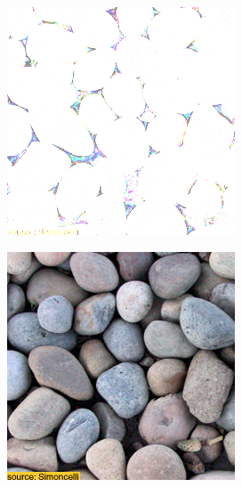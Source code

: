 \begin{figure}[]
\begin{subfigure}{\textwidth}
\begin{subfigure}{0.24\textwidth}
            \caption*{}
        \end{subfigure}
        \hfill
        \begin{subfigure}{0.24\textwidth}
            \centering
            \includegraphics[width=\textwidth]{images/04-experiment01/pebbles/1000/pebbles_im.jpg}
            \caption*{}
        \end{subfigure}
        \hfill
        \begin{subfigure}{0.24\textwidth}
            \centering
            \includegraphics[width=\textwidth]{images/04-experiment01/pebbles/1000/pebbles_proj.jpg}
            \caption*{}
        \end{subfigure}


\end{subfigure}
\end{figure}
